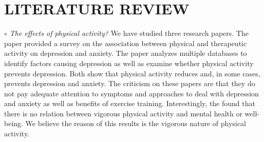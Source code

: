 \documentclass[letterpaper, 10 pt, conference]{ieeeconf}  %
\begin{document}


\section{LITERATURE REVIEW}

\par\noindent\textit{$\circ$ The effects of physical activity?}\newline
We have studied three research papers.  
The \cite{strohle2009physical} paper provided a survey on the association 
between physical and therapeutic activity on depression and anxiety. 
The \cite{mammen2013physical} paper analyzes multiple databases to identify factors causing depression as 
well as examine whether physical activity prevents depression. Both show that
physical activity reduces and, in some cases, prevents depression and anxiety. 
The criticism on these papers are that they do not pay adequate attention to symptoms 
and approaches to deal with depression and anxiety as well as benefits of exercise training.
Interestingly, the \cite{van2013exploratory} found that there is no 
relation between vigorous physical activity and mental health or well-being. We believe 
the reason of this results is the vigorous nature of physical activity. 
\end{document}
